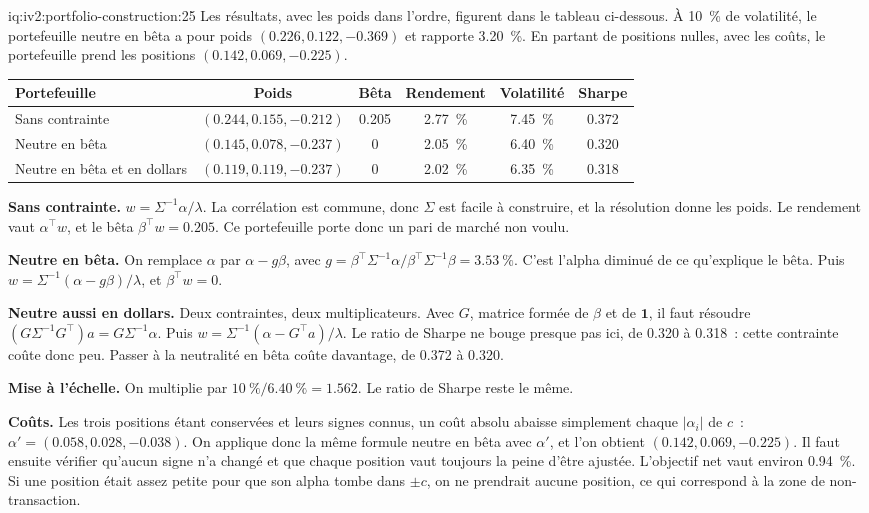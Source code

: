 \begin{solution}{iq:iv2:portfolio-construction:25}
Les résultats, avec les poids dans l'ordre, figurent dans le tableau ci-dessous. À 10~\% de volatilité, le portefeuille neutre en bêta a pour poids $(0.226, 0.122, -0.369)$ et rapporte 3.20~\%. En partant de positions nulles, avec les coûts, le portefeuille prend les positions $(0.142, 0.069, -0.225)$.

\begin{center}
\begin{tabular}{lccccc}
\toprule
Portefeuille & Poids & Bêta & Rendement & Volatilité & Sharpe \\
\midrule
Sans contrainte & $(0.244, 0.155, -0.212)$ & 0.205 & 2.77~\% & 7.45~\% & 0.372 \\
Neutre en bêta & $(0.145, 0.078, -0.237)$ & 0 & 2.05~\% & 6.40~\% & 0.320 \\
Neutre en bêta et en dollars & $(0.119, 0.119, -0.237)$ & 0 & 2.02~\% & 6.35~\% & 0.318 \\
\bottomrule
\end{tabular}
\end{center}

\textbf{Sans contrainte.} $w = \Sigma^{-1}\alpha/\lambda$. La corrélation est commune, donc $\Sigma$ est facile à construire, et la résolution donne les poids. Le rendement vaut $\alpha^\top w$, et le bêta $\beta^\top w = 0.205$. Ce portefeuille porte donc un pari de marché non voulu.

\textbf{Neutre en bêta.} On remplace $\alpha$ par $\alpha - g\beta$, avec $g = \beta^\top\Sigma^{-1}\alpha/\beta^\top\Sigma^{-1}\beta = 3.53~\%$. C'est l'alpha diminué de ce qu'explique le bêta. Puis $w = \Sigma^{-1}(\alpha - g\beta)/\lambda$, et $\beta^\top w = 0$.

\textbf{Neutre aussi en dollars.} Deux contraintes, deux multiplicateurs. Avec $G$, matrice formée de $\beta$ et de $\mathbf{1}$, il faut résoudre $(G\Sigma^{-1}G^\top)a = G\Sigma^{-1}\alpha$. Puis $w = \Sigma^{-1}(\alpha - G^\top a)/\lambda$. Le ratio de Sharpe ne bouge presque pas ici, de 0.320 à 0.318~: cette contrainte coûte donc peu. Passer à la neutralité en bêta coûte davantage, de 0.372 à 0.320.

\textbf{Mise à l'échelle.} On multiplie par $10~\%/6.40~\% = 1.562$. Le ratio de Sharpe reste le même.

\textbf{Coûts.} Les trois positions étant conservées et leurs signes connus, un coût absolu abaisse simplement chaque $|\alpha_i|$ de $c$~: $\alpha' = (0.058, 0.028, -0.038)$. On applique donc la même formule neutre en bêta avec $\alpha'$, et l'on obtient $(0.142, 0.069, -0.225)$. Il faut ensuite vérifier qu'aucun signe n'a changé et que chaque position vaut toujours la peine d'être ajustée. L'objectif net vaut environ 0.94~\%. Si une position était assez petite pour que son alpha tombe dans $\pm c$, on ne prendrait aucune position, ce qui correspond à la zone de non-transaction.


\end{solution}
